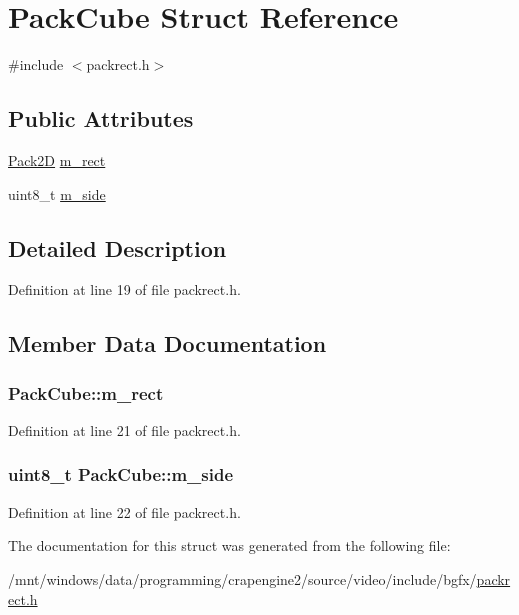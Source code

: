 \hypertarget{struct_pack_cube}{\section{Pack\+Cube Struct Reference}
\label{struct_pack_cube}
}


{\ttfamily \#include $<$packrect.\+h$>$}

\subsection*{Public Attributes}
\begin{DoxyCompactItemize}
\item 
\hyperlink{struct_pack2_d}{Pack2\+D} \hyperlink{struct_pack_cube_a9591ae1fd93b8459279b19e165b5865d}{m\+\_\+rect}
\item 
uint8\+\_\+t \hyperlink{struct_pack_cube_aa519bf4d36a64315df6f23c73619cb01}{m\+\_\+side}
\end{DoxyCompactItemize}


\subsection{Detailed Description}


Definition at line 19 of file packrect.\+h.



\subsection{Member Data Documentation}
\hypertarget{struct_pack_cube_a9591ae1fd93b8459279b19e165b5865d}{
\subsubsection[{m\+\_\+rect}]{ Pack\+Cube\+::m\+\_\+rect}}\label{struct_pack_cube_a9591ae1fd93b8459279b19e165b5865d}


Definition at line 21 of file packrect.\+h.

\hypertarget{struct_pack_cube_aa519bf4d36a64315df6f23c73619cb01}{
\subsubsection[{m\+\_\+side}]{\setlength{\rightskip}{0pt plus 5cm}uint8\+\_\+t Pack\+Cube\+::m\+\_\+side}}\label{struct_pack_cube_aa519bf4d36a64315df6f23c73619cb01}


Definition at line 22 of file packrect.\+h.



The documentation for this struct was generated from the following file\+:\begin{DoxyCompactItemize}
\item 
/mnt/windows/data/programming/crapengine2/source/video/include/bgfx/\hyperlink{packrect_8h}{packrect.\+h}\end{DoxyCompactItemize}
